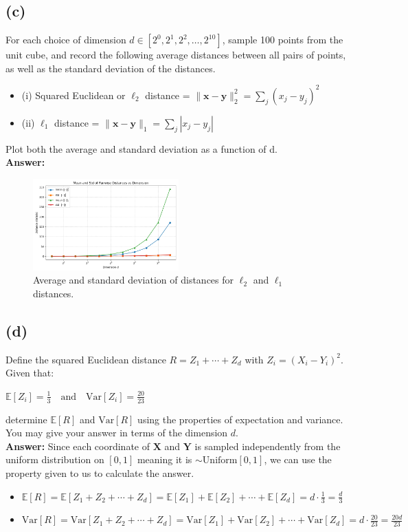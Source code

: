 \documentclass{article}
\begin{document}
\subsection*{(c)}
For each choice of dimension $d \in [2^0, 2^1, 2^2, \dots, 2^{10}]$, sample 100 points from the unit cube, and record the following average distances between all pairs of points, as well as the standard deviation of the distances.
\begin{itemize}
    \item (i) Squared Euclidean or $\ell_2$ distance = $\| \mathbf{x} - \mathbf{y} \|_2^2 = \sum_j (x_j - y_j)^2$
    \item (ii) $\ell_1$ distance = $\| \mathbf{x} - \mathbf{y} \|_1 = \sum_j |x_j - y_j|$
\end{itemize}
Plot both the average and standard deviation as a function of d. \\
\color{answer}
\textbf{Answer:}
\begin{figure}[h!]
    \centering
    \includegraphics[width=0.5\textwidth]{images/Figure_1_combined.png}
    \caption{Average and standard deviation of distances for $\ell_2$ and $\ell_1$ distances.}
    \label{fig:distances}
\end{figure}

\color{black}
\subsection*{(d)}
Define the squared Euclidean distance $R = Z_1 + \cdots + Z_d$ with $Z_i = (X_i - Y_i)^2$. Given that:
\begin{center}
$\mathbb{E}[Z_i] = \frac{1}{3} \quad \text{and} \quad \mathrm{Var}[Z_i] = \frac{20}{23}$
\end{center}
determine $\mathbb{E}[R]$ and $\mathrm{Var}[R]$ using the properties of expectation and variance. You may give your answer in terms of the dimension $d$. \\
\color{answer}
\textbf{Answer:} Since each coordinate of $\mathbf{X}$ and $\mathbf{Y}$ is sampled independently from the uniform distribution on $[0,1]$ meaning it is $\sim \mathrm{Uniform}[0,1]$, we can use the property given to us to calculate the answer.
\begin{itemize}
    \item $\mathbb{E}[R] = \mathbb{E}[Z_1 + Z_2 + \cdots + Z_d] = \mathbb{E}[Z_1] + \mathbb{E}[Z_2] + \cdots + \mathbb{E}[Z_d] = d \cdot \frac{1}{3} = \frac{d}{3}$
    \item $\mathrm{Var}[R] = \mathrm{Var}[Z_1 + Z_2 + \cdots + Z_d] = \mathrm{Var}[Z_1] + \mathrm{Var}[Z_2] + \cdots + \mathrm{Var}[Z_d] = d \cdot \frac{20}{23} = \frac{20d}{23}$
\end{itemize}
\color{black}
\end{document}
